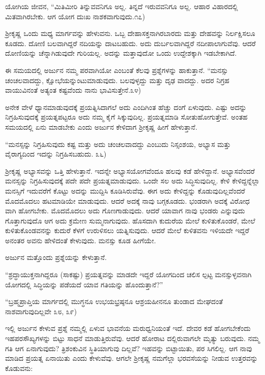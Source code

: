 ಯೋಗಿಯ ಜೀವನ, “ಮಿತಿಮೀರಿ ತಿನ್ನುವವನಿಗೂ ಅಲ್ಲ. ತಿನ್ನದೆ ಇರುವವನಿಗೂ ಅಲ್ಲ. ಆಹಾರ ವಿಹಾರದಲ್ಲಿ ಮಿತವಾಗಿರಬೇಕು. ಆಗ ಯೋಗ ದುಃಖ ನಾಶಕವಾಗುವುದು.೧೭)

ಶ್ರೀಕೃಷ್ಣ ಒಂದು ಮಧ್ಯ ಮಾರ್ಗವನ್ನು ಹೇಳುವನು. ಒಬ್ಬ ದೇಹಾಸಕ್ತನಾಗಿರಬಾರದು ಮತ್ತು ದೇಹವನ್ನು ನಿರ್ಲಕ್ಷಿಸಲೂ ಕೂಡದು. ದೋಣಿ ಬಲವಾಗಿದ್ದರೆ ನದಿಯನ್ನು ದಾಟಬಹುದು. ಅದು ದುರ್ಬಲವಾಗಿದ್ದರೆ ನದೀಪಾಲಾಗುವೆವು. ಆದರೆ ದೋಣಿಯನ್ನು ಚೆನ್ನಾಗಿಡುವುದೇ ಗುರಿಯಲ್ಲ. ಅದನ್ನು ಮತ್ತಾವುದೋ ಒಂದು ಉದ್ದೇಶಕ್ಕಾಗಿ ಇಡಬೇಕಾಗಿದೆ.

ಈ ಸಮಯದಲ್ಲಿ ಅರ್ಜುನ ನಮ್ಮ ಪರವಾಗಿಯೋ ಎಂಬಂತೆ ಕೆಲವು ಪ್ರಶ್ನೆಗಳನ್ನು ಹಾಕುತ್ತಾನೆ. “ಮನಸ್ಸು ಚಂಚಲವಾದದ್ದು, ಕ್ಷೋಭೆಯನ್ನುಂಟುಮಾಡುವುದು. ಬಲವುಳ್ಳದ್ದು ಮತ್ತು ದೃಢ ವಾದದ್ದು. ಅದರ ನಿಗ್ರಹ ವಾಯುವಿನಂತೆ ಅತ್ಯಂತ ಕಷ್ಟವೆಂದು ನಾನು ಭಾವಿಸುತ್ತೇನೆ.೩೪)

ಅನೇಕ ವೇಳೆ ಧ್ಯಾನಮಾಡುವುದಕ್ಕೆ ಪ್ರಯತ್ನಿಸಿದಾಗಲೆ ಅದು ಎಂದಿಗಿಂತ ಹೆಚ್ಚು ದಂಗೆ ಏಳುವುದು. ಎಷ್ಟು ಅದನ್ನು ನಿಗ್ರಹಿಸುವುದಕ್ಕೆ ಪ್ರಯತ್ನಪಟ್ಟರೂ ಅದು ನಮ್ಮ ಕೈಗೆ ಸಿಕ್ಕುವುದಿಲ್ಲ. ಪ್ರಯತ್ನಮಾಡಿ ಸೋತುಹೋಗುತ್ತೇವೆ. ಅಂತಹ ಸಮಯದಲ್ಲಿ ಏನು ಮಾಡಬೇಕು ಎಂದು ಅರ್ಜುನ ಕೇಳಿದಾಗ ಶ್ರೀಕೃಷ್ಣ ಹೀಗೆ ಹೇಳುತ್ತಾನೆ.

“ಮನಸ್ಸನ್ನು ನಿಗ್ರಹಿಸುವುದು ಕಷ್ಟ ಮತ್ತು ಅದು ಚಂಚಲವಾದದ್ದು ಎಂಬುದು ನಿಸ್ಸಂಶಯ, ಅಭ್ಯಾಸ ಮತ್ತು ವೈರಾಗ್ಯದಿಂದ ಇದನ್ನು ನಿಗ್ರಹಿಸಬಹುದು. ೩೬)

ಶ್ರೀಕೃಷ್ಣ ಅಭ್ಯಾಸವನ್ನು ಒತ್ತಿ ಹೇಳುತ್ತಾನೆ. ಇದನ್ನೇ ಅಭ್ಯಾಸಯೋಗವೆಂದೂ ಹಲವು ಕಡೆ ಹೇಳಿದ್ದಾನೆ. ಅಭ್ಯಾಸವೆಂದರೆ ಮನಸ್ಸನ್ನು ನಿಗ್ರಹಿಸುವುದಕ್ಕೆ ಪದೇ ಪದೇ ಪ್ರಯತ್ನಮಾಡುವುದು. ಒಂದೇ ಸಲ ಅದು ಸಿದ್ಧಿಸುವುದಿಲ್ಲ. ಕೇಳಿ ಕೇಳಿದ್ದನ್ನೆಲ್ಲಾ ಮನಸ್ಸಿಗೆ ಇದುವರೆಗೆ ಕೊಟ್ಟು ಅದನ್ನು ಮುದ್ದಿಸಿ ಕೂಡಿಸಿರುವೆವು. ಈಗ ಅದು ಕೇಳಿದ್ದನ್ನು ಕೊಡುವುದಿಲ್ಲವೆಂದರೆ ಮೊದಮೊದಲು ಹಟಮಾಡಿಯೇ ಮಾಡುವುದು. ಆದರೆ ಅದಕ್ಕೆ ನಾವು ಬಗ್ಗಕೂಡದು. ಭಂಡರಾಗಿ ಅದಕ್ಕೆ ವಿರೋಧ ವಾಗಿ ಹೋಗಬೇಕು. ಮೊದಮೊದಲು ಅದು ಗೊಣಗಾಡುವುದು. ಆದರೆ ಯಾವಾಗ ನಾವು ಭಂಡರು ಎನ್ನುವುದು ಗೊತ್ತಾಗುವುದೊ ಆಗ ಅದು ಕ್ರಮೇಣ ಸುಮ್ಮನಾಗುವುದು. ಹೊಸದಾಗಿ ಕುದುರೆಯ ಮೇಲೆ ಕುಳಿತುಕೊಂಡರೆ, ಮೇಲೆ ಕುಳಿತುಕೊಂಡವನನ್ನು ಕುದುರೆ ಕೆಳಗೆ ಉರುಳಿಸಲು ಯತ್ನಿಸುವುದು. ಆದರೆ ಮೇಲೆ ಕುಳಿತವನು ಇಳಿಯದೇ ಇದ್ದರೆ ಅನಂತರ ಅವನು ಹೇಳಿದಂತೆ ಕೇಳುವುದು. ಮನಸ್ಸು ಕೂಡ ಹೀಗೆಯೇ.

ಅರ್ಜುನ ಮತ್ತೊಂದು ಪ್ರಶ್ನೆಯನ್ನು ಕೇಳುತ್ತಾನೆ.

“ಶ್ರದ್ಧಾಯುಕ್ತನಾಗಿದ್ದರೂ (ಸಾಕಷ್ಟು) ಪ್ರಯತ್ನವನ್ನು ಮಾಡದೇ ಇದ್ದರೆ ಯೋಗದಿಂದ ಚಲಿಸ ಲ್ಪಟ್ಟ ಮನಸ್ಸುಳ್ಳವನಾಗಿ ಯೋಗದಲ್ಲಿ ಸಿದ್ಧಿಯನ್ನು ಪಡೆಯದೆ ಯಾವ ಗತಿಯನ್ನು ಹೊಂದುತ್ತಾನೆ?”

“ಬ್ರಹ್ಮಪ್ರಾಪ್ತಿಯ ಮಾರ್ಗದಲ್ಲಿ ಮುಗ್ಧನೂ ಉಭಯಭ್ರಷ್ಠನೂ ಆಶ್ರಯಹೀನನೂ ತುಂಡಾದ ಮೇಘದಂತೆ ನಾಶವಾಗುವುದಿಲ್ಲವೇ ೩೮, ೩೯)

ಇಲ್ಲಿ ಅರ್ಜುನ ಕೇಳುವ ಪ್ರಶ್ನೆ ನಮ್ಮಲ್ಲಿ ಏಳುವ ಭಾವನೆಯ ಮರುಧ್ವನಿಯಂತೆ ಇದೆ. ದೇವರ ಕಡೆ ಹೋಗಬೇಕೆಂದು ಇಹಪರಸೌಖ್ಯಗಳನ್ನು ಬಿಟ್ಟು ಸಾಧನೆ ಮಾಡುತ್ತಿರುವೆವು. ಆದರೆ ಹೋರಾಟ ದಲ್ಲಿರುವಾಗಲೇ ಮೃತ್ಯು ಬರುವುದು. ನಮ್ಮ ಗತಿ ಆಗ ಏನಾಗುವುದು? ತ್ರಿಶಂಕುವಿನ ಸ್ಥಿತಿಯಾಗುವು ದಿಲ್ಲವೆ? ಇಹವನ್ನು ಬಿಟ್ಟಾಯಿತು, ಪರ ಸಿಗಲಿಲ್ಲ. ಆಗ ನಾವು ಮಾಡಿದ ಪ್ರಯತ್ನ ಏನಾಯಿತು ಎಂದು ಕೇಳುವೆವು. ಆಗಲೇ ಶ್ರೀಕೃಷ್ಣ ನಮಗೆಲ್ಲಾ ಭರವಸೆಯನ್ನು ನೀಡುವ ಉತ್ತರವನ್ನು ಕೊಡುವನು:

